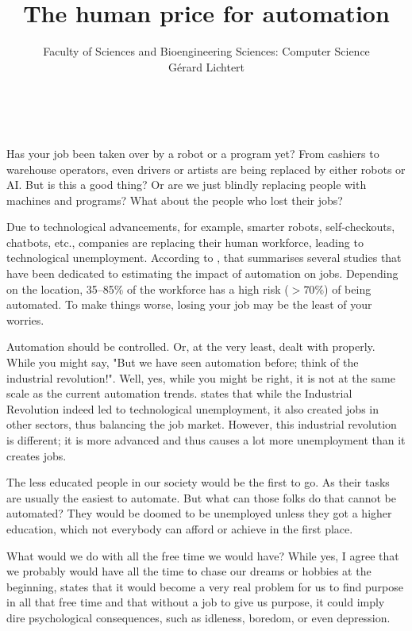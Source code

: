 \documentclass[a4paper, 14pt]{extarticle}
\title{The human price for automation}
\date{}%
\author{Faculty of Sciences and Bioengineering Sciences: Computer Science \\ \vspace{1mm} Gérard Lichtert}
\makeatletter
\renewcommand{\maketitle}{\bgroup\setlength{\parindent}{2mm}
\begin{flushleft}
  \textbf{\@author}\\
  \vspace{1mm}
  \underline{\@title}
\end{flushleft}\egroup
}
\makeatother
\begin{document}
\maketitle
\begin{flushleft}
Has your job been taken over by a robot or a program yet? From cashiers to warehouse operators, even drivers or artists are being replaced by either robots or AI. But is this a good thing? Or are we just blindly replacing people with machines and programs? What about the people who lost their jobs?
\end{flushleft}
\begin{flushleft}
Due to technological advancements, for example, smarter robots, self-checkouts, chatbots, etc., companies are replacing their human workforce, leading to technological unemployment. According to \cite{mdpi}, that summarises several studies that have been dedicated to estimating the impact of automation on jobs. Depending on the location, 35–85\% of the workforce has a high risk ($>70\%$) of being automated. To make things worse, losing your job may be the least of your worries.
\end{flushleft}
\begin{flushleft}
Automation should be controlled. Or, at the very least, dealt with properly. While you might say, "But we have seen automation before; think of the industrial revolution!". Well, yes, while you might be right, it is not at the same scale as the current automation trends. \cite{mdpi} states that while the Industrial Revolution indeed led to technological unemployment, it also created jobs in other sectors, thus balancing the job market. However, this industrial revolution is different; it is more advanced and thus causes a lot more unemployment than it creates jobs.
\end{flushleft}
\begin{flushleft}
The less educated people in our society would be the first to go. As their tasks are usually the easiest to automate. But what can those folks do that cannot be automated? They would be doomed to be unemployed unless they got a higher education, which not everybody can afford or achieve in the first place.
\end{flushleft}
\begin{flushleft}
What would we do with all the free time we would have? While yes, I agree that we probably would have all the time to chase our dreams or hobbies at the beginning, \cite{mdpi} states that it would become a very real problem for us to find purpose in all that free time and that without a job to give us purpose, it could imply dire psychological consequences, such as idleness, boredom, or even depression.
\end{flushleft}
\end{document}

